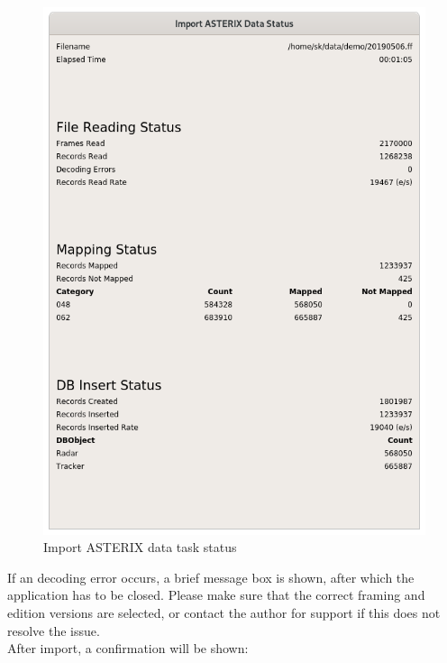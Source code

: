 \begin{figure}[H]
  \center
    \includegraphics[width=12cm]{../screenshots/asterix_import_status.png}
  \caption{Import ASTERIX data task status}
\end{figure}

If an decoding error occurs, a brief message box is shown, after which the application has to be closed. Please make sure that the correct framing and edition versions are selected, or contact the author for support if this does not resolve the issue. \\

After import, a confirmation will be shown:


